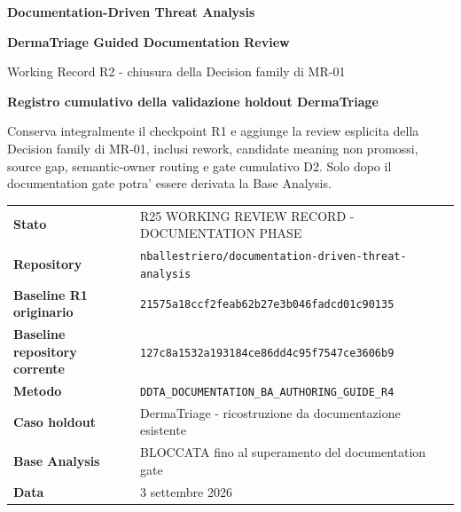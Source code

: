 \documentclass[11pt,a4paper]{article}
\begin{document}

\begin{titlepage}
\thispagestyle{empty}
\vspace*{8mm}

{\sffamily\bfseries\color{DDTANavy}\fontsize{15}{18}\selectfont Documentation-Driven Threat Analysis}\par
\vspace{5mm}
{\sffamily\bfseries\color{DDTANavy}\fontsize{29}{33}\selectfont DermaTriage Guided Documentation Review}\par
\vspace{2mm}
{\sffamily\color{DDTABlue}\fontsize{18}{22}\selectfont Working Record R2 - chiusura della Decision family di MR-01}\par

\vspace{10mm}
\begin{tcolorbox}[enhanced,arc=3pt,boxrule=0pt,colback=DDTANavy,left=12pt,right=12pt,top=11pt,bottom=11pt]
{\color{white}\sffamily\bfseries\large Registro cumulativo della validazione holdout DermaTriage}\par
\vspace{2mm}
{\color{white!88}\small Conserva integralmente il checkpoint R1 e aggiunge la review esplicita della Decision family di MR-01, inclusi rework, candidate meaning non promossi, source gap, semantic-owner routing e gate cumulativo D2. Solo dopo il documentation gate potra' essere derivata la Base Analysis.}
\end{tcolorbox}

\vspace{8mm}
\begin{tabularx}{\textwidth}{L{42mm}Y}
\toprule
\textbf{Stato} & R25 WORKING REVIEW RECORD - DOCUMENTATION PHASE \\
\textbf{Repository} & \texttt{nballestriero/documentation-driven-threat-analysis} \\
\textbf{Baseline R1 originario} & \texttt{21575a18ccf2feab62b27e3b046fadcd01c90135} \\
\textbf{Baseline repository corrente} & \texttt{127c8a1532a193184ce86dd4c95f7547ce3606b9} \\
\textbf{Metodo} & \texttt{DDTA\_DOCUMENTATION\_BA\_AUTHORING\_GUIDE\_R4} \\
\textbf{Caso holdout} & DermaTriage - ricostruzione da documentazione esistente \\
\textbf{Base Analysis} & BLOCCATA fino al superamento del documentation gate \\
\textbf{Data} & 3 settembre 2026 \\
\bottomrule
\end{tabularx}


\end{titlepage}
\end{document}
